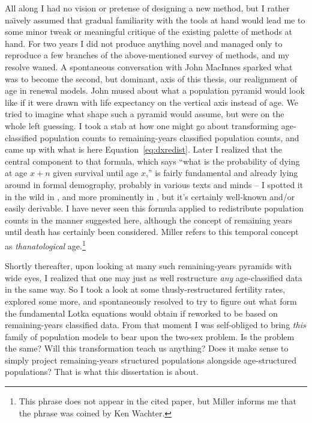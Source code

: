 All along I had no vision or pretense of designing a new method, but I rather
na\"{\i}vely assumed that gradual familiarity with the tools at hand would lead
me to some minor tweak or meaningful critique of the existing palette of methods at
hand. For two years I did not produce anything novel and managed only to
reproduce a few branches of the above-mentioned survey of methods, and my
resolve waned. A spontaneous conversation with John MacInnes sparked
what was to become the second, but dominant, axis of this thesis, our
realignment of age in renewal models. John
mused about what a population pyramid would look like if it were drawn with
life expectancy on the vertical axis instead of age. We tried to imagine what
shape such a pyramid would assume, but were on the whole left guessing. I took a
stab at how one might go about transforming age-classified population counts to
remaining-years classified population counts, and came up with what is here
Equation~\ref{eq:dxredist}. Later I realized that the central component to that
formula, which says ``what is the probability of dying at age $x+n$ given
survival until age $x$,'' is fairly fundamental and already lying around in
formal demography, probably in various texts and minds -- I spotted it in the
wild in \citet{vaupel2009life}, and more prominently in
\citet{miller2001increasing}, but it's certainly well-known and/or easily
derivable. I have never seen this formula applied to redistribute population counts in the manner
suggested here, although the concept of remaining years until death has
certainly been considered. Miller refers to this
temporal concept as \textit{thanatological} age.\footnote{This phrase does not
appear in the cited paper, but Miller informs me that the phrase was
coined by Ken Wachter.}

Shortly thereafter, upon looking at many such remaining-years pyramids with
wide eyes, I realized that one may just as well restructure \textit{any}
age-classified data in the same way. So I took a look at some thusly-restructured fertility rates, explored
some more, and spontaneously resolved to try to figure out what form the
fundamental Lotka equations would obtain if reworked to be based on
remaining-years classified data. From that moment I was self-obliged to 
bring \textit{this} family of
population models to bear upon the two-sex problem. Is the problem the same?
Will this transformation teach us anything? Does it make sense to simply
project remaining-years structured populations alongside age-structured
populations? That is what this dissertation is about.

